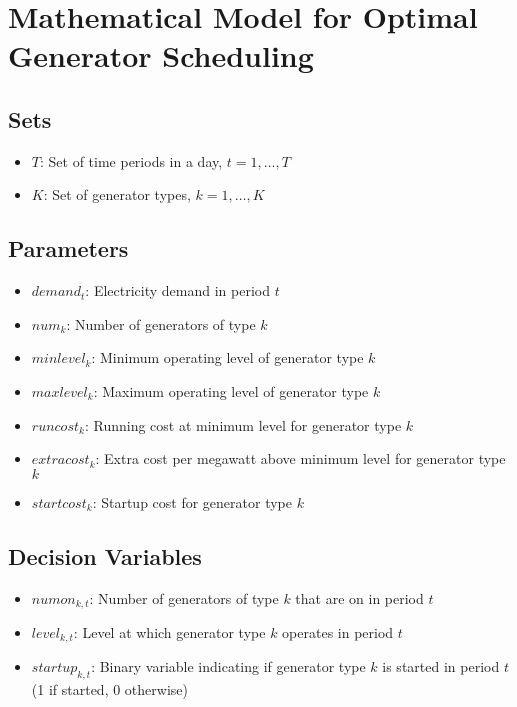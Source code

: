 \documentclass{article}
\begin{document}
\section*{Mathematical Model for Optimal Generator Scheduling}

\subsection*{Sets}
\begin{itemize}
    \item $T$: Set of time periods in a day, $t = 1, \ldots, T$
    \item $K$: Set of generator types, $k = 1, \ldots, K$
\end{itemize}

\subsection*{Parameters}
\begin{itemize}
    \item $demand_t$: Electricity demand in period $t$
    \item $num_k$: Number of generators of type $k$
    \item $minlevel_k$: Minimum operating level of generator type $k$
    \item $maxlevel_k$: Maximum operating level of generator type $k$
    \item $runcost_k$: Running cost at minimum level for generator type $k$
    \item $extracost_k$: Extra cost per megawatt above minimum level for generator type $k$
    \item $startcost_k$: Startup cost for generator type $k$
\end{itemize}

\subsection*{Decision Variables}
\begin{itemize}
    \item $numon_{k,t}$: Number of generators of type $k$ that are on in period $t$
    \item $level_{k,t}$: Level at which generator type $k$ operates in period $t$
    \item $startup_{k,t}$: Binary variable indicating if generator type $k$ is started in period $t$ (1 if started, 0 otherwise)
\end{itemize}
\end{document}

